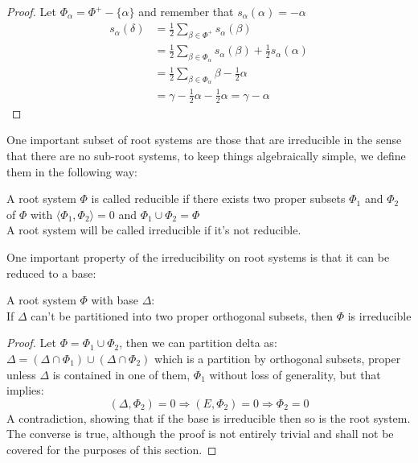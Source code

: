\begin{proof}
	Let $\Phi_\alpha = \Phi^+-\{\alpha\}$ and remember that $s_\alpha(\alpha)=-\alpha$
	\begin{align*}
		s_\alpha(\delta) &= \displaystyle \frac{1}{2}\sum_{\beta \in \Phi^+} s_\alpha(\beta)\\
		&= \displaystyle \frac{1}{2}\sum_{\beta \in \Phi_\alpha}  s_\alpha(\beta) + \frac{1}{2}s_\alpha(\alpha)\\
		&= \frac{1}{2}\sum_{\beta \in \Phi_\alpha} \beta - \frac{1}{2}\alpha\\
		&= \gamma - \frac{1}{2}\alpha - \frac{1}{2} \alpha = \gamma-\alpha
	\end{align*}
\end{proof}

One important subset of root systems are those that are irreducible in the sense that there are no sub-root systems, to keep things algebraically simple, we define them in the following way:
\begin{defi}
	\label{irredRS}
	A root system $\Phi$ is called reducible if there exists two proper subsets $\Phi_1$ and $\Phi_2$ of $\Phi$ with $\langle \Phi_1,\Phi_2 \rangle = 0$ and $\Phi_1 \cup \Phi_2 = \Phi$\\
	A root system will be called irreducible if it's not reducible.
\end{defi}
One important property of the irreducibility on root systems is that it can be reduced to a base:
\begin{prop}
	A root system $\Phi$ with base $\Delta$:\\
	If $\Delta$ can't be partitioned into two proper orthogonal subsets, then $\Phi$ is irreducible
	\label{irbaseimplyirroot}
\end{prop}
\begin{proof}
	Let $\Phi = \Phi_1 \cup \Phi_2$, then we can partition delta as: $\Delta = (\Delta \cap \Phi_1) \cup (\Delta \cap \Phi_2)$ which is a partition by orthogonal subsets, proper unless $\Delta$ is contained in one of them,  $\Phi_1$ without loss of generality, but that implies:
	$$(\Delta,\Phi_2) = 0 \Rightarrow (E,\Phi_2) = 0 \Rightarrow \Phi_2 = 0$$
	A contradiction, showing that if the base is irreducible then so is the root system.\\
	The converse is true, although the proof is not entirely trivial and shall not be covered for the purposes of this section.
\end{proof}